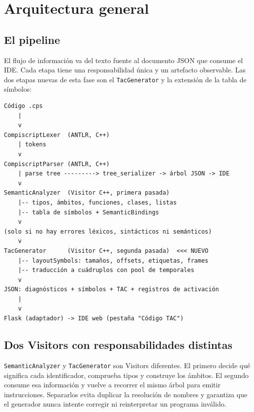 \documentclass[11pt,a4paper]{article}
\begin{document}
\section{Arquitectura general}

\subsection{El pipeline}

El flujo de información va del texto fuente al documento JSON que consume el
IDE. Cada etapa tiene una responsabilidad única y un artefacto observable. Las
dos etapas nuevas de esta fase son el \texttt{TacGenerator} y la extensión de la
tabla de símbolos:

\begin{center}
\begin{minipage}{0.86\textwidth}
\ttfamily\small
\begin{verbatim}
Código .cps
    |
    v
CompiscriptLexer  (ANTLR, C++)
    | tokens
    v
CompiscriptParser (ANTLR, C++)
    | parse tree ---------> tree_serializer -> árbol JSON -> IDE
    v
SemanticAnalyzer  (Visitor C++, primera pasada)
    |-- tipos, ámbitos, funciones, clases, listas
    |-- tabla de símbolos + SemanticBindings
    v
(solo si no hay errores léxicos, sintácticos ni semánticos)
    v
TacGenerator      (Visitor C++, segunda pasada)  <<< NUEVO
    |-- layoutSymbols: tamaños, offsets, etiquetas, frames
    |-- traducción a cuádruplos con pool de temporales
    v
JSON: diagnósticos + símbolos + TAC + registros de activación
    |
    v
Flask (adaptador) -> IDE web (pestaña "Código TAC")
\end{verbatim}
\end{minipage}
\end{center}

\subsection{Dos Visitors con responsabilidades distintas}

\texttt{SemanticAnalyzer} y \texttt{TacGenerator} son Visitors diferentes. El
primero decide qué significa cada identificador, comprueba tipos y construye los
ámbitos. El segundo consume esa información y vuelve a recorrer el mismo árbol
para emitir instrucciones. Separarlos evita duplicar la resolución de nombres y
garantiza que el generador nunca intente corregir ni reinterpretar un programa
inválido.
\end{document}
